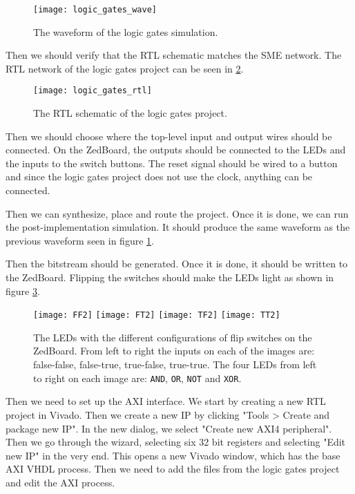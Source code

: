 \begin{figure}
    \texttt{[image: logic\_gates\_wave]}
    \caption{The waveform of the logic gates simulation.}
    \label{fig:logic-wave}
\end{figure}

Then we should verify that the RTL schematic matches the SME network. The RTL
network of the logic gates project can be seen in \ref{fig:logic-rtl}.

\begin{figure}
    \texttt{[image: logic\_gates\_rtl]}
    \caption{The RTL schematic of the logic gates project.}
    \label{fig:logic-rtl}
\end{figure}

Then we should choose where the top-level input and output wires should be
connected. On the ZedBoard, the outputs should be connected to the LEDs and the
inputs to the switch buttons. The reset signal should be wired to a button and
since the logic gates project does not use the clock, anything can be connected.

Then we can synthesize, place and route the project. Once it is done, we can
run the post-implementation simulation. It should produce the same waveform as
the previous waveform seen in figure \ref{fig:logic-wave}.

Then the bitstream should be generated. Once it is done, it should be written
to the ZedBoard. Flipping the switches should make the LEDs light as shown in
figure \ref{fig:logic-fpga}.

\begin{figure}
    \texttt{[image: FF2]}
    \texttt{[image: FT2]}
    \texttt{[image: TF2]}
    \texttt{[image: TT2]}
    \caption{The LEDs with the different configurations of flip switches on the
    ZedBoard. From left to right the inputs on each of the images are:
    false-false, false-true, true-false, true-true. The four LEDs from left to
    right on each image are: \texttt{AND}, \texttt{OR}, \texttt{NOT} and
    \texttt{XOR}.}
    \label{fig:logic-fpga}
\end{figure}

Then we need to set up the AXI interface. We start by creating a new RTL project
in Vivado. Then we create a new IP by clicking "Tools > Create and package new
IP". In the new dialog, we select "Create new AXI4 peripheral". Then we go
through the wizard, selecting six 32 bit registers and selecting "Edit new IP"
in the very end. This opens a new Vivado window, which has the base AXI VHDL
process. Then we need to add the files from the logic gates project and edit
the AXI process.

